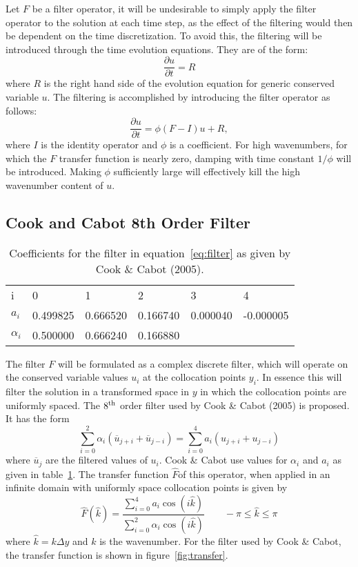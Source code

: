 Let $F$ be a filter operator, it will be undesirable to simply apply the
filter operator to the solution at each time step, as the effect of the
filtering would then be dependent on the time discretization. To avoid
this, the filtering will be introduced through the time evolution
equations. They are of the form:
\begin{equation}
\frac{\partial u}{\partial t} = R
\end{equation}
where $R$ is the right hand side of the evolution equation for generic
conserved variable $u$. The filtering is accomplished by introducing the
filter operator as follows:
\begin{equation}
\frac{\partial u}{\partial t} = \phi(F-I)u + R,
\label{eq:time_filter}
\end{equation}
where $I$ is the identity operator and $\phi$ is a coefficient. For high
wavenumbers, for which the $F$ transfer function is nearly zero, damping
with time constant $1/\phi$ will be introduced. Making $\phi$
sufficiently large will effectively kill the high wavenumber content of
$u$.


\subsection{Cook and Cabot 8th Order Filter}

\begin{table}[t]
\begin{center}
\begin{tabular}{llllll}
i&0&1&2&3&4\\
$a_i$&0.499825&0.666520&0.166740&0.000040&-0.000005\\
$\alpha_i$&0.500000&0.666240&0.166880
\end{tabular}
\end{center}
\caption{Coefficients for the filter in equation~\ref{eq:filter} as
 given by Cook \& Cabot (2005).}
\label{tab:coefficients}
\end{table}

The filter $F$ will be formulated as a complex discrete filter, which
will operate on the conserved variable values $u_i$ at the collocation
points $y_i$. In essence this will filter the solution in a transformed
space in $y$ in which the collocation points are uniformly spaced. The
$8^{\rm th}$ order filter used by Cook \& Cabot (2005) is proposed. It
has the form
\begin{equation}
\sum_{i=0}^2 \alpha_i(\overline u_{j+i} + \overline u_{j-i}) = \sum_{i=0}^4
 a_i(u_{j+i}+u_{j-i})
\label{eq:filter}
\end{equation}
where $\overline u_j$ are the filtered values of $u_i$. Cook \& Cabot use
values for $\alpha_i$ and $a_i$ as given in table~\ref{tab:coefficients}. The transfer
function $\hat F$of this operator, when applied in an infinite domain with
uniformly space collocation points is given by
\begin{equation}
\hat F(\hat k)=\frac{\sum_{i=0}^4a_i\cos(i\hat
 k)}{\sum_{i=0}^2\alpha_i\cos(i\hat k)}\qquad -\pi\leq\hat k\leq\pi
\label{eq:transfer}
\end{equation}
where $\hat k=k\Delta y$ and $k$ is the wavenumber. For the filter used
by Cook \& Cabot, the transfer function is shown in figure~\ref{fig:transfer}.

